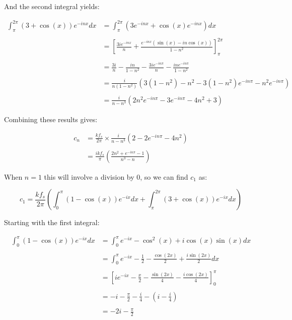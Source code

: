 \begin{appendices}
		And the second integral yields:

		\begin{align}
			\int_{\pi}^{2\pi} (3+\cos(x))e^{-inx} dx & = 
				\int_{\pi}^{2\pi} \left( 3e^{-inx} + \cos(x)e^{-inx} \right) dx \nonumber \\
			\nonumber \\
			& = \left[ \frac{3ie^{-inx}}{n} + \frac{e^{-inx}(\sin(x) - 
				in\cos(x))}{1 - n^{2}} \right]_{\pi}^{2\pi} \nonumber \\
			\nonumber \\
			& = \frac{3i}{n} - \frac{in}{1 - n^{2}} - \frac{3ie^{-in\pi}}{n} - 
				\frac{ine^{-in\pi}}{1 - n^{2}} \nonumber \\
			\nonumber \\
			& = \frac{i}{n(1-n^{2})} \left( 3(1-n^{2}) - n^{2} - 
				3(1-n^{2})e^{-in\pi} - n^{2}e^{-in\pi} \right) \nonumber \\
			\nonumber \\
			& = \frac{i}{n - n^{3}} \left( 2n^{2}e^{-in\pi} - 3e^{-in\pi} - 4n^{2} + 3 \right) \nonumber
		\end{align}

		Combining these results gives:

		\begin{align}
			c_{n} & = \frac{kf_{s}}{2\pi} \times \frac{i}{n - n^{3}} \left( 2 - 2e^{-in\pi} - 4n^{2} \right) 
				\nonumber \\
			\nonumber \\
			& = \frac{ikf_{s}}{\pi} \left( \frac{2n^{2} + e^{-in\pi} - 1}{n^{3} - n} \right) \nonumber
		\end{align}

		When $n = 1$ this will involve a division by 0, so we can find $c_{1}$ as:

		\[ c_{1} = \frac{kf_{s}}{2\pi} \left( \int_{0}^{\pi} (1-\cos(x))e^{-ix} dx
						      + \int_{\pi}^{2\pi} (3 + \cos(x))e^{-ix} dx 
						      \right) \]

		Starting with the first integral:
		
		\begin{align}
			\int_{0}^{\pi} (1-\cos(x))e^{-ix} dx & = \int_{0}^{\pi} e^{-ix} - 
				\cos^{2}(x) + i\cos(x)\sin(x) dx \nonumber \\
			\nonumber \\
			& = \int_{0}^{\pi} e^{-ix} - \frac{1}{2} - 
				\frac{\cos(2x)}{2} + \frac{i\sin(2x)}{2} dx \nonumber \\
			\nonumber \\
			& = \left[ ie^{-ix} - \frac{x}{2} - \frac{\sin(2x)}{4} - 
				\frac{i\cos(2x)}{4} \right]_{0}^{\pi} \nonumber \\
			\nonumber \\
			& = -i - \frac{\pi}{2} - \frac{i}{4} - \left( i - \frac{i}{4} \right) \nonumber \\
			\nonumber \\
			& = -2i - \frac{\pi}{2} \nonumber
		\end{align}


\end{appendices}
